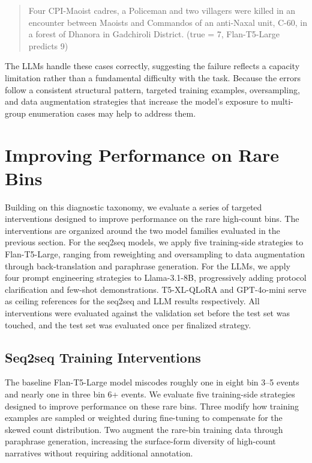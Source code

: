\documentclass[
  11pt,
]{article}
\begin{document}
\begin{quote}
Four CPI-Maoist cadres, a Policeman and two villagers were killed in an
encounter between Maoists and Commandos of an anti-Naxal unit, C-60, in
a forest of Dhanora in Gadchiroli District. (true = 7, Flan-T5-Large
predicts 9)
\end{quote}

\noindent The LLMs handle these cases correctly, suggesting the failure
reflects a capacity limitation rather than a fundamental difficulty with
the task. Because the errors follow a consistent structural pattern,
targeted training examples, oversampling, and data augmentation
strategies that increase the model's exposure to multi-group enumeration
cases may help to address them.

\section{Improving Performance on Rare
Bins}\label{improving-performance-on-rare-bins}

Building on this diagnostic taxonomy, we evaluate a series of targeted
interventions designed to improve performance on the rare high-count
bins. The interventions are organized around the two model families
evaluated in the previous section. For the seq2seq models, we apply five
training-side strategies to Flan-T5-Large, ranging from reweighting and
oversampling to data augmentation through back-translation and
paraphrase generation. For the LLMs, we apply four prompt engineering
strategies to Llama-3.1-8B, progressively adding protocol clarification
and few-shot demonstrations. T5-XL-QLoRA and GPT-4o-mini serve as
ceiling references for the seq2seq and LLM results respectively. All
interventions were evaluated against the validation set before the test
set was touched, and the test set was evaluated once per finalized
strategy.

\subsection{Seq2seq Training
Interventions}\label{seq2seq-training-interventions}

The baseline Flan-T5-Large model miscodes roughly one in eight bin 3--5
events and nearly one in three bin 6+ events. We evaluate five
training-side strategies designed to improve performance on these rare
bins. Three modify how training examples are sampled or weighted during
fine-tuning to compensate for the skewed count distribution. Two augment
the rare-bin training data through paraphrase generation, increasing the
surface-form diversity of high-count narratives without requiring
additional annotation.
\end{document}
